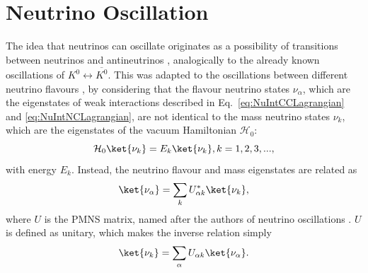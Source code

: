 


\section{Neutrino Oscillation}
The idea that neutrinos can oscillate originates as a possibility of transitions between neutrinos and antineutrinos \cite{Pontecorvo57.pdf,Pontecorvo58.pdf}, analogically to the already known oscillations of $K^{0}\leftrightarrow \overline{K^0}$. This was adapted to the oscillations between different neutrino flavours \cite{MNS1962Osc.pdf,Pontecorvo69.pdf}, by considering that the flavour neutrino states $\nu_\alpha$, which are the eigenstates of weak interactions described in Eq.~\ref{eq:NuIntCCLagrangian} and \ref{eq:NuIntNCLagrangian}, are not identical to the mass neutrino states $\nu_k$, which are the eigenstates of the vacuum Hamiltonian $\mathcal{H}_0$:
\begin{equation}\label{eq:NuOscVacHamiltonian}
\mathcal{H}_0\ket{\nu_k}=E_k\ket{\nu_k}, k=1,2,3,...,
\end{equation}
with energy $E_k$. Instead, the neutrino flavour and mass eigenstates are related as
\begin{equation}\label{eq:NuOscFlavourMassRel}
\ket{\nu_{\alpha}}=\sum_{k} U_{\alpha k}^{*}\ket{\nu_{k}},
\end{equation}
where $U$ is the \gls{PMNS} matrix, named after the authors of neutrino oscillations \cite{FundamentalsOfNeutrinoPhysics.pdf, Gonzalez-GarciaNuMassesAndMixing.pdf}. $U$ is defined as unitary, which makes the inverse relation simply
\begin{equation}\label{eq:NuOscMassFlavourRel}
\ket{\nu_k}=\sum_\alpha U_{\alpha k}\ket{\nu_\alpha}.
\end{equation}

